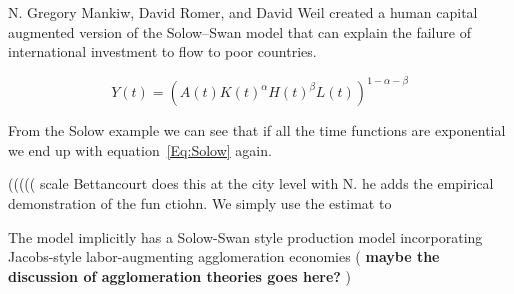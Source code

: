 N. Gregory Mankiw, David Romer, and David Weil created a human capital augmented version of the Solow–Swan model that can explain the failure of international investment to flow to poor countries.

    \[Y(t)=(A(t)K(t)^\alpha H(t)^\beta L(t))^{1-\alpha -\beta} \]
    
    From the Solow example we can see that if all the time functions are exponential we end up with equation~\ref{Eq:Solow} again.
    
 

(((((   scale Bettancourt does this at the city level with N. he adds the empirical demonstration of the fun ctiohn. We  simply use the estimat to    

The model implicitly has a Solow-Swan style production model incorporating Jacobs-style labor-augmenting agglomeration economies (\textbf{\color{blue} maybe the discussion of agglomeration theories goes here? }) 









\color{black}
